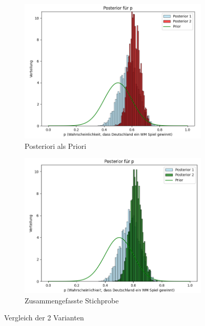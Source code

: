 \documentclass[a4paper,12pt]{article}
\begin{document}
\begin{figure}[h]
  \begin{subfigure}[b]{0.45\textwidth}
    \includegraphics[width=\textwidth]{../images/framesAnimatedRecursive/frame1.png}
    \caption{Posteriori als Priori}
    \label{fig:bild5}
  \end{subfigure}
  \hfill
  \begin{subfigure}[b]{0.45\textwidth}
    \includegraphics[width=\textwidth]{../images/framesAnimatedRecursive/frame2.png}
    \caption{Zusammengefasste Stichprobe}
    \label{fig:bild6}
  \end{subfigure}

  \caption{Vergleich der 2 Varianten}
  \label{fig:mainfig}
\end{figure}
\newpage
\end{document}
